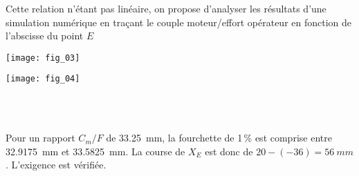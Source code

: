 


Cette relation n’étant pas linéaire, on propose d’analyser les résultats d’une
simulation numérique en traçant le couple moteur/effort opérateur en fonction de l’abscisse du point $E$

\ifprof
\else
\begin{marginfigure}
\texttt{[image: fig\_03]}
\end{marginfigure}

\begin{marginfigure}
\texttt{[image: fig\_04]}
\end{marginfigure}

\fi
{}
\ifprof
\begin{corrige}~\\
\end{corrige}
\else
\fi


\ifprof
\begin{corrige}~\\
Pour un rapport $C_m/F$ de \SI{33,25}{mm}, la fourchette de 1\,\% est comprise entre \SI{32,9175}{mm} et \SI{33,5825}{mm}. La course de $X_E$ est donc de $20 - (-36)=\SI{56}{mm}$. L'exigence est vérifiée.
\end{corrige}
\else
\fi


%
